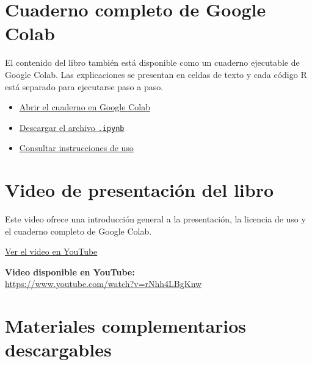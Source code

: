 \documentclass[
  spanish,
  10.5pt,
  letterpaper,
  openany,
  headings=big]{scrbook}
\providecommand{\tightlist}{%
  \setlength{\itemsep}{0pt}\setlength{\parskip}{0pt}}
\begin{document}
\section*{Cuaderno completo de Google
Colab}\label{cuaderno-completo-de-google-colab}


El contenido del libro también está disponible como un cuaderno
ejecutable de Google Colab. Las explicaciones se presentan en celdas de
texto y cada código R está separado para ejecutarse paso a paso.

\begin{itemize}
\tightlist
\item
  \href{https://colab.research.google.com/github/gilbertorodriguez59/libro-machine-learning-r-dev/blob/main/Aprendizaje_y_Clasificacion_Automatica_con_R_Colab.ipynb}{Abrir
  el cuaderno en Google Colab}
\item
  \href{Aprendizaje_y_Clasificacion_Automatica_con_R_Colab.ipynb}{Descargar
  el archivo \texttt{.ipynb}}
\item
  \href{00-cuaderno-google-colab.qmd}{Consultar instrucciones de uso}
\end{itemize}

\section*{Video de presentación del
libro}\label{video-de-presentaciuxf3n-del-libro}


Este video ofrece una introducción general a la presentación, la
licencia de uso y el cuaderno completo de Google Colab.

\href{https://www.youtube.com/watch?v=rNhh4LBgKnw}{Ver el video en
YouTube}

\textbf{Video disponible en YouTube:}\\
\url{https://www.youtube.com/watch?v=rNhh4LBgKnw}

\section*{Materiales complementarios
descargables}\label{materiales-complementarios-descargables}
\end{document}
